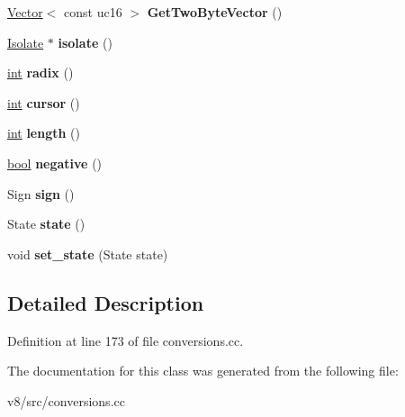 \begin{DoxyCompactItemize}
\item 
\mbox{\label{classv8_1_1internal_1_1StringToIntHelper_a7708873d848d7c90663e2c1dc9557193}} 
\mbox{\hyperlink{classv8_1_1internal_1_1Vector}{Vector}}$<$ const uc16 $>$ {\bfseries Get\+Two\+Byte\+Vector} ()
\item 
\mbox{\label{classv8_1_1internal_1_1StringToIntHelper_ad44fa2baf1924e11f07c626981edeec2}} 
\mbox{\hyperlink{classv8_1_1internal_1_1Isolate}{Isolate}} $\ast$ {\bfseries isolate} ()
\item 
\mbox{\label{classv8_1_1internal_1_1StringToIntHelper_abf947b3b6129b69de439f480d012eff0}} 
\mbox{\hyperlink{classint}{int}} {\bfseries radix} ()
\item 
\mbox{\label{classv8_1_1internal_1_1StringToIntHelper_aaae24f1a947dfafc4dee5f7e262a7935}} 
\mbox{\hyperlink{classint}{int}} {\bfseries cursor} ()
\item 
\mbox{\label{classv8_1_1internal_1_1StringToIntHelper_adca90b85a20b2af2013f2e2c1e177505}} 
\mbox{\hyperlink{classint}{int}} {\bfseries length} ()
\item 
\mbox{\label{classv8_1_1internal_1_1StringToIntHelper_ad9f8fcda6ee41b30679dc032b9aa6b20}} 
\mbox{\hyperlink{classbool}{bool}} {\bfseries negative} ()
\item 
\mbox{\label{classv8_1_1internal_1_1StringToIntHelper_a6b3386a547dc31974bb8547c26f8c521}} 
Sign {\bfseries sign} ()
\item 
\mbox{\label{classv8_1_1internal_1_1StringToIntHelper_a3b8ed1a2fa95ce794b4cb548a6485eb0}} 
State {\bfseries state} ()
\item 
\mbox{\label{classv8_1_1internal_1_1StringToIntHelper_a16893f439330e9763090dbad80303f3c}} 
void {\bfseries set\+\_\+state} (State state)
\end{DoxyCompactItemize}


\subsection{Detailed Description}


Definition at line 173 of file conversions.\+cc.



The documentation for this class was generated from the following file\+:\begin{DoxyCompactItemize}
\item 
v8/src/conversions.\+cc\end{DoxyCompactItemize}
